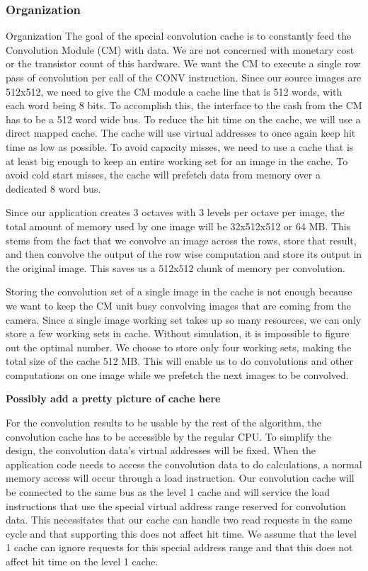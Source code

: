 \subsubsection{Organization}
Organization
The goal of the special convolution cache is to constantly feed the Convolution Module (CM) with data. We are not concerned with monetary cost or the transistor count of this hardware. We want the CM to execute a single row pass of convolution per call of the CONV instruction. Since our source images are 512x512, we need to give the CM module a cache line that is 512 words, with each word being 8 bits. To accomplish this, the interface to the cash from the CM has to be a 512 word wide bus. To reduce the hit time on the cache, we will use a direct mapped cache. The cache will use virtual addresses to once again keep hit time as low as possible. To avoid capacity misses, we need to use a cache that is at least big enough to keep an entire working set for an image in the cache. To avoid cold start misses, the cache will prefetch data from memory over a dedicated 8 word bus.

Since our application creates 3 octaves with 3 levels per octave per image, the total amount of memory used by one image will be 32x512x512 or 64 MB. This stems from the fact that we convolve an image across the rows, store that result, and then convolve the output of the row wise computation and store its output in the original image. This saves us a 512x512 chunk of memory per convolution.

Storing the convolution set of a single image in the cache is not enough because we want to keep the CM unit busy convolving images that are coming from the camera. Since a single image working set takes up so many resources, we can only store a few working sets in cache. Without simulation, it is impossible to figure out the optimal number. We choose to store only four working sets, making the total size of the cache 512 MB. This will enable us to do convolutions and other computations on one image while we prefetch the next images to be convolved.

{\bf Possibly add a pretty picture of cache here}

For the convolution results to be usable by the rest of the algorithm, the convolution cache has to be accessible by the regular CPU. To simplify the design, the convolution data's virtual addresses will be fixed. When the application code needs to access the convolution data to do calculations, a normal memory access will occur through a load instruction. Our convolution cache will be connected to the same bus as the level 1 cache and will service the load instructions that use the special virtual address range reserved for convolution data. This necessitates that our cache can handle two read requests in the same cycle and that supporting this does not affect hit time. We assume that the level 1 cache can ignore requests for this special address range and that this does not affect hit time on the level 1 cache.

